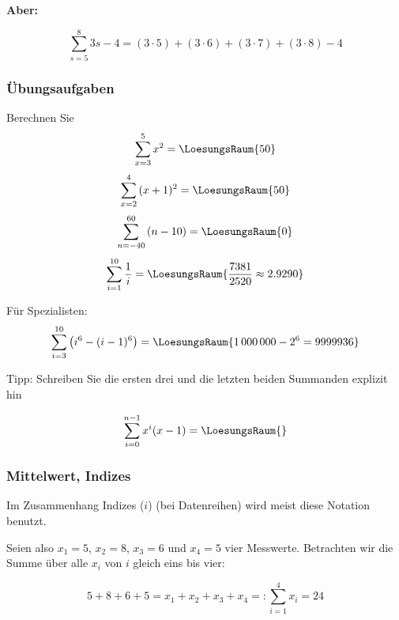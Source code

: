 \textbf{Aber:}

\begin{beispiel}{}{}
  $$\sum_{s=5}^{8}{3s-4} = (3\cdot 5) + (3\cdot 6) + (3\cdot 7) + (3\cdot 8) - 4$$  
\end{beispiel}


\subsubsection{Übungsaufgaben}
Berechnen Sie
$$\sum_{x=3}^5{x^2} = \LoesungsRaum{50}$$
$$\sum_{x=2}^4{(x+1)^2} = \LoesungsRaum{50}$$
$$\sum_{n=-40}^{60}{(n-10)} = \LoesungsRaum{0}$$
$$\sum_{i=1}^{10}{\frac{1}{i}} = \LoesungsRaum{\frac{7381}{2520} \approx 2.9290}$$

Für Spezialisten:
$$\sum_{i=3}^{10}\left(i^6 - ( i-1 )^6\right) = \LoesungsRaum{1\,000\,000 - 2^6 = 9999936}$$

Tipp: Schreiben Sie die ersten drei und die letzten beiden Summanden
explizit hin

$$\sum_{i=0}^{n-1}x^i(x-1)=\LoesungsRaum{}$$


\newpage



\subsubsection{Mittelwert, Indizes}
Im Zusammenhang Indizes ($i$) (\zB bei Datenreihen) wird meist diese
Notation benutzt.

Seien also $x_1=5$, $x_2=8$, $x_3=6$ und $x_4=5$ vier
Messwerte. Betrachten wir die Summe über
alle $x_i$ von $i$ gleich eins bis vier:

$$5+8+6+5 = x_1 + x_2 + x_3 + x_4 =: \sum_{i=1}^4{x_i}=24$$


